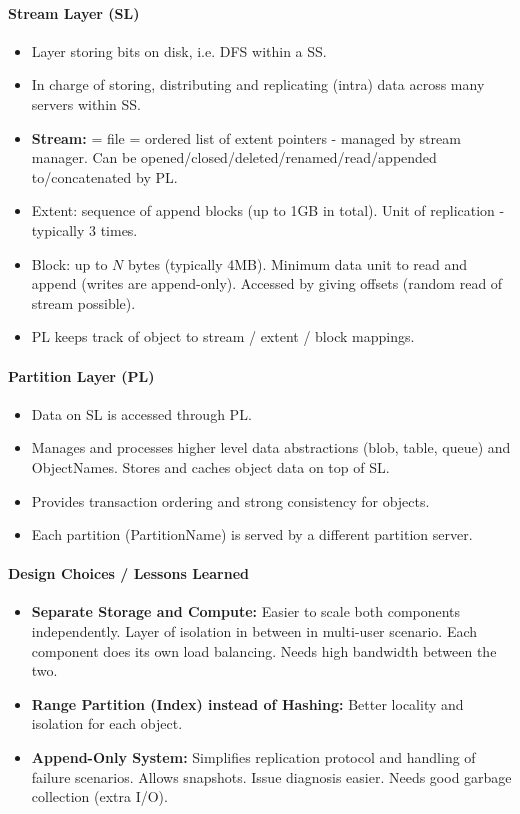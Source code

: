 \paragraph{Stream Layer (SL)}
\begin{itemize}
    \item Layer storing bits on disk, i.e. DFS within a SS.
    \item In charge of storing, distributing and replicating (intra) data across many servers within SS.
    \item \textbf{Stream:} = file = ordered list of extent pointers - managed by stream manager. Can be opened/closed/deleted/renamed/read/appended to/concatenated by PL.
    \item Extent: sequence of append blocks (up to 1GB in total). Unit of replication - typically 3 times.
    \item Block: up to $N$ bytes (typically 4MB). Minimum data unit to read and append (writes are append-only). Accessed by giving offsets (random read of stream possible).
    \item PL keeps track of object to stream / extent / block mappings.
\end{itemize}

\paragraph{Partition Layer (PL)}
\begin{itemize}
    \item Data on SL is accessed through PL.
    \item Manages and processes higher level data abstractions (blob, table, queue) and ObjectNames. Stores and caches object data on top of SL.
    \item Provides transaction ordering and strong consistency for objects.
    \item Each partition (PartitionName) is served by a different partition server.
\end{itemize}


\paragraph{Design Choices / Lessons Learned}
\begin{itemize}
    \item \textbf{Separate Storage and Compute:} Easier to scale both components independently. Layer of isolation in between in multi-user scenario. Each component does its own load balancing. Needs high bandwidth between the two.
    \item \textbf{Range Partition (Index) instead of Hashing:} Better locality and isolation for each object.
    \item \textbf{Append-Only System:} Simplifies replication protocol and handling of failure scenarios. Allows snapshots. Issue diagnosis easier. Needs good garbage collection (extra I/O).
\end{itemize}

